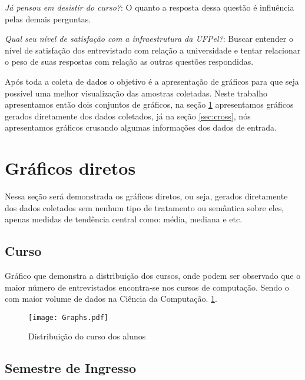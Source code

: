\documentclass[11pt]{scrartcl} %
\begin{document}
\item[\textit{Já pensou em desistir do curso?}:] O quanto a resposta dessa questão é influência pelas demais perguntas.  

\item[\textit{Qual seu nível de satisfação com a infraestrutura da UFPel?}:] Buscar entender o nível de satisfação dos entrevistado com relação a universidade e tentar relacionar o peso de suas respostas com  relação as outras questões respondidas.

Após toda a coleta de dados o objetivo é a apresentação de gráficos para que seja possível uma melhor visualização das amostras coletadas. Neste trabalho apresentamos então dois conjuntos de gráficos, na seção \ref{sec:raw} apresentamos gráficos gerados diretamente dos dados coletados,
já na seção \ref{sec:cross}, nós apresentamos gráficos crusando algumas informações dos dados de entrada.


\section{Gráficos diretos}\label{sec:raw}

Nessa seção será demonstrada os gráficos diretos, ou seja, gerados diretamente dos dados coletados sem nenhum tipo de tratamento ou semântica sobre eles, apenas medidas de tendência central como: média, mediana e etc.

\subsection{Curso}

Gráfico que demonstra a distribuição dos cursos, onde podem ser observado que o maior número de entrevistados encontra-se nos cursos de computação. Sendo o com maior volume de dados na Ciência da Computação. \ref{fig:graph1}.

\begin{figure}[h]
  \centering
  \texttt{[image: Graphs.pdf]}
  \label{fig:graph1}
  \caption{Distribuição do curso dos alunos}
\end{figure}

\subsection{Semestre de Ingresso}
\end{document}
